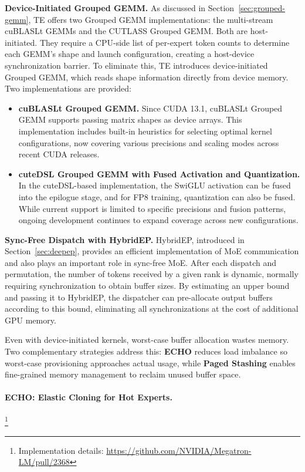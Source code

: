 \documentclass[10pt,logo,copyright]{nvidiatechreport}
\begin{document}
\textbf{Device-Initiated Grouped GEMM.}
As discussed in Section~\ref{sec:grouped-gemm}, TE offers two Grouped GEMM implementations: the multi-stream cuBLASLt GEMMs and the CUTLASS Grouped GEMM. Both are host-initiated. They require a CPU-side list of per-expert token counts to determine each GEMM's shape and launch configuration, creating a host-device synchronization barrier. To eliminate this, TE introduces device-initiated Grouped GEMM, which reads shape information directly from device memory. Two implementations are provided:

\begin{itemize}
\item[i.] \textbf{cuBLASLt Grouped GEMM.}
Since CUDA 13.1, cuBLASLt Grouped GEMM supports passing matrix shapes as device arrays. This implementation includes built-in heuristics for selecting optimal kernel configurations, now covering various precisions and scaling modes across recent CUDA releases.

\item[ii.] \textbf{cuteDSL Grouped GEMM with Fused Activation and Quantization.}
In the cuteDSL-based implementation, the SwiGLU activation can be fused into the epilogue stage, and for FP8 training, quantization can also be fused. While current support is limited to specific precisions and fusion patterns, ongoing development continues to expand coverage across new configurations.
\end{itemize}

\textbf{Sync-Free Dispatch with HybridEP.}
HybridEP, introduced in Section~\ref{sec:deepep}, provides an efficient implementation of MoE communication and also plays an important role in sync-free MoE. After each dispatch and permutation, the number of tokens received by a given rank is dynamic, normally requiring synchronization to obtain buffer sizes. By estimating an upper bound and passing it to HybridEP, the dispatcher can pre-allocate output buffers according to this bound, eliminating all synchronizations at the cost of additional GPU memory.

Even with device-initiated kernels, worst-case buffer allocation wastes memory. Two complementary strategies address this: \textbf{ECHO} reduces load imbalance so worst-case provisioning approaches actual usage, while \textbf{Paged Stashing} enables fine-grained memory management to reclaim unused buffer space.

\paragraph{ECHO: Elastic Cloning for Hot Experts.}\label{sec:echo}\footnote{Implementation details: \url{https://github.com/NVIDIA/Megatron-LM/pull/2368}}
\end{document}
